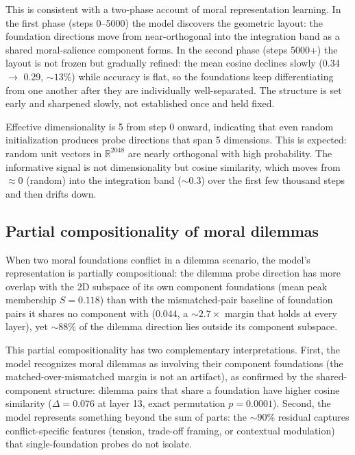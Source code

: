 This is consistent with a two-phase account of moral representation
learning. In the first phase (steps 0--5000) the model discovers the
geometric layout: the foundation directions move from near-orthogonal
into the integration band as a shared moral-salience component forms.
In the second phase (steps 5000+) the layout is not frozen but
gradually refined: the mean cosine declines slowly (0.34 $\to$ 0.29,
\({\sim}13\%\)) while accuracy is flat, so the foundations keep
differentiating from one another after they are individually
well-separated. The structure is set early and sharpened slowly,
not established once and held fixed.

Effective dimensionality is 5 from step 0 onward, indicating that
even random initialization produces probe directions that span 5
dimensions. This is expected: random unit vectors in
\(\mathbb{R}^{2048}\) are nearly orthogonal with high probability.
The informative signal is not dimensionality but cosine similarity,
which moves from \(\approx 0\) (random) into the integration band
(\({\sim}0.3\)) over the first few thousand steps and then drifts down.

\subsection{Partial compositionality of moral dilemmas}\label{partial-compositionality-of-moral-dilemmas}

When two moral foundations conflict in a dilemma scenario, the
model's representation is partially compositional: the dilemma probe
direction has more overlap with the 2D subspace of its own component
foundations (mean peak membership \(S = 0.118\)) than with the
mismatched-pair baseline of foundation pairs it shares no component
with (\(0.044\), a \({\sim}2.7\times\) margin that holds at every layer),
yet \({\sim}88\)\% of the dilemma direction lies outside its component
subspace.

This partial compositionality has two complementary
interpretations. First, the model recognizes moral dilemmas as
involving their component foundations (the matched-over-mismatched
margin is not an artifact), as confirmed by the shared-component
structure: dilemma pairs that share a foundation have higher cosine
similarity (\(\Delta = 0.076\) at layer 13, exact permutation
\(p = 0.0001\)). Second, the model represents something beyond the sum
of parts: the \({\sim}90\)\% residual captures conflict-specific
features (tension, trade-off framing, or contextual modulation)
that single-foundation probes do not isolate.

